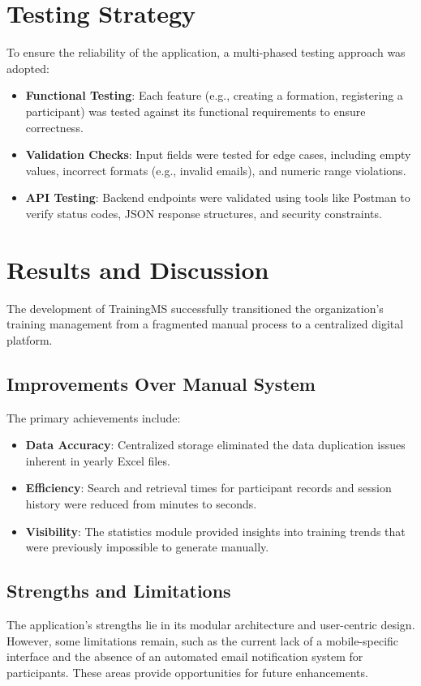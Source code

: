 \section{Testing Strategy}
To ensure the reliability of the application, a multi-phased testing approach was adopted:
\begin{itemize}
    \item \textbf{Functional Testing}: Each feature (e.g., creating a formation, registering a participant) was tested against its functional requirements to ensure correctness.
    \item \textbf{Validation Checks}: Input fields were tested for edge cases, including empty values, incorrect formats (e.g., invalid emails), and numeric range violations.
    \item \textbf{API Testing}: Backend endpoints were validated using tools like Postman to verify status codes, JSON response structures, and security constraints.
\end{itemize}

\section{Results and Discussion}
The development of TrainingMS successfully transitioned the organization's training management from a fragmented manual process to a centralized digital platform. 

\subsection{Improvements Over Manual System}
The primary achievements include:
\begin{itemize}
    \item \textbf{Data Accuracy}: Centralized storage eliminated the data duplication issues inherent in yearly Excel files.
    \item \textbf{Efficiency}: Search and retrieval times for participant records and session history were reduced from minutes to seconds.
    \item \textbf{Visibility}: The statistics module provided insights into training trends that were previously impossible to generate manually.
\end{itemize}

\subsection{Strengths and Limitations}
The application's strengths lie in its modular architecture and user-centric design. However, some limitations remain, such as the current lack of a mobile-specific interface and the absence of an automated email notification system for participants. These areas provide opportunities for future enhancements.
